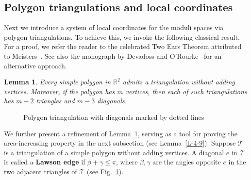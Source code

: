 \documentclass[11pt,letterpaper]{amsart}
\theoremstyle{plain}
\newtheorem{lemma}[theorem]{Lemma}
\theoremstyle{definition}
\theoremstyle{remark}
\numberwithin{equation}{section}
\begin{document}
\subsection{Polygon triangulations and local coordinates}
Next we introduce a system of local coordinates for the moduli spaces via polygon triangulations. To achieve this, we invoke the following classical result. For a proof, we refer the reader to the celebrated Two Ears Theorem attributed to Meisters~\cite{Meisters-1975}. See also the monograph by Devadoss and O'Rourke~\cite[Theorem 1.4]{Devadoss-2011} for an alternative approach.

\begin{lemma}\label{L-4-2}
Every simple polygon in $\mathbb R^2$ admits a triangulation without adding vertices. Moreover, if the polygon has $m$ vertices, then each of such triangulations has $m-2$ triangles and $m-3$ diagonals.
\end{lemma}


\begin{figure}[htbp]
     \centering
{}
\caption{Polygon triangulation with diagonals marked by dotted lines}
\label{F-2}
\end{figure}

We further present a refinement of Lemma~\ref{L-4-2},  serving as a tool for proving the area-increasing property in the next subsection (see Lemma~\ref{L-4-9}). Suppose
$\mathcal T$ is a triangulation of a simple polygon without adding vertices. A diagonal $e$ in $\mathcal T$ is called  a \textbf{Lawson edge} if $\beta+\gamma\leq \pi$, where $\beta,\gamma$ are the angles opposite $e$ in the two adjacent triangles of $\mathcal T$ (see Fig.~\ref{F-2}).
\end{document}
